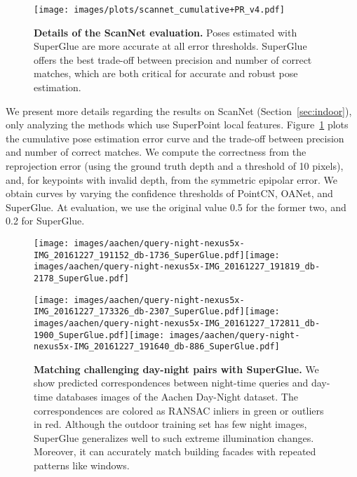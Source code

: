 \documentclass[10pt,twocolumn,letterpaper]{article}
\newcommand{\PAR}[1]{\vskip4pt \noindent{\bf #1~}}
\renewcommand{\*}[1]{\mathbf{#1}}
\newcommand{\0}{\phantom{0}}
\begin{document}
\begin{figure}[b]
\vspace{-4mm}
\centering
    \texttt{[image: images/plots/scannet\_cumulative+PR\_v4.pdf]}\vspace{-.1cm}\caption{\textbf{Details of the ScanNet evaluation.}
    Poses estimated with SuperGlue are more accurate at all error thresholds.
    SuperGlue offers the best trade-off between precision and number of correct matches, which are both critical for accurate and robust pose estimation.
    }
    \label{fig:supp-scannet-plots}
\end{figure}

\PAR{ScanNet:} We present more details regarding the results on ScanNet (Section~\ref{sec:indoor}), only analyzing the methods which use SuperPoint local features.  Figure~\ref{fig:supp-scannet-plots} plots the cumulative pose estimation error curve and the trade-off between precision and number of correct matches. We compute the correctness from the reprojection error (using the ground truth depth and a threshold of 10 pixels), and, for keypoints with invalid depth, from the symmetric epipolar error. We obtain curves by varying the confidence thresholds of PointCN, OANet, and SuperGlue. At evaluation, we use the original value 0.5 for the former two, and 0.2 for SuperGlue.

\begin{figure*}[b]
\vspace{-.1cm}
\centering
\def\iwidth{2.65cm}
\begin{minipage}{\linewidth}
\centering
\texttt{[image: images/aachen/query-night-nexus5x-IMG\_20161227\_191152\_db-1736\_SuperGlue.pdf]}\hspace{2mm}\texttt{[image: images/aachen/query-night-nexus5x-IMG\_20161227\_191819\_db-2178\_SuperGlue.pdf]}\end{minipage}

\vspace{1mm}
\begin{minipage}{\linewidth}
\centering
\texttt{[image: images/aachen/query-night-nexus5x-IMG\_20161227\_173326\_db-2307\_SuperGlue.pdf]}\hspace{2mm}\texttt{[image: images/aachen/query-night-nexus5x-IMG\_20161227\_172811\_db-1900\_SuperGlue.pdf]}\hspace{2mm}\texttt{[image: images/aachen/query-night-nexus5x-IMG\_20161227\_191640\_db-886\_SuperGlue.pdf]}\end{minipage}
\vspace{-.1in}
\caption{{\bf Matching challenging day-night pairs with SuperGlue.} We show predicted correspondences between night-time queries and day-time databases images of the Aachen Day-Night dataset. The correspondences are colored as RANSAC inliers in {\color{green}green} or outliers in {\color{red}red}. Although the outdoor training set has few night images, SuperGlue generalizes well to such extreme illumination changes. Moreover, it can accurately match building facades with repeated patterns like windows.
}\label{fig:aachen}\vspace{-.2cm}
\end{figure*}
\end{document}
